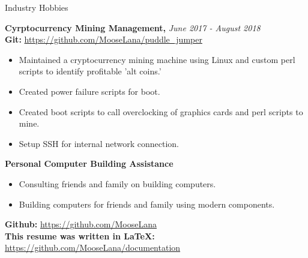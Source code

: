 \documentclass{resume} %
\begin{document}
\newpage


\begin{rSection}{Industry Hobbies} 

{\bf Cyrptocurrency Mining Management, }{\em June 2017 - August 2018} 
\\
{\bf Git: }\url {https://github.com/MooseLana/puddle_jumper}
\begin{itemize}
\item Maintained a cryptocurrency mining machine using Linux and custom perl scripts to identify profitable 'alt coins.'
\item Created power failure scripts for boot.
\item Created boot scripts to call overclocking of graphics cards and perl scripts to mine.
\item Setup SSH for internal network connection.
\end{itemize}

\hfill \break

{\bf Personal Computer Building Assistance}
\begin{itemize}
\item Consulting friends and family on building computers.
\item Building computers for friends and family using modern components.
\end{itemize}

\hfill \break

{\bf Github: }\url{https://github.com/MooseLana}
\\
{\bf This resume was written in LaTeX: }\url { https://github.com/MooseLana/documentation}
\end{rSection}
\end{document}
